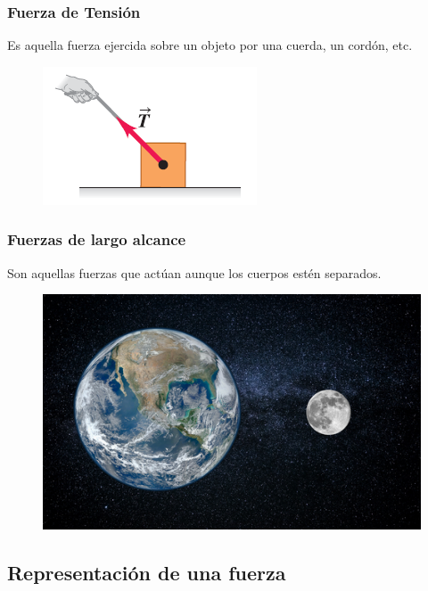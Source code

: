 \documentclass[14pt]{beamer}
\begin{document}
\begin{frame}
\frametitle{Fuerza de Tensión}
Es aquella fuerza  ejercida sobre un objeto por una cuerda, un cordón, etc.
\begin{figure}
    \centering
    \includegraphics[scale=0.7]{Imagenes/Fuerza_05.png}
\end{figure}
\end{frame}
\begin{frame}
\frametitle{Fuerzas de largo alcance}
Son aquellas fuerzas que actúan aunque los cuerpos estén separados.
\pause
\begin{figure}
    \centering
    \includegraphics[scale=1.3]{Imagenes/Fuerza_09.jpg}
\end{figure}
\end{frame}

\subsection{Representación de una fuerza}
\end{document}
